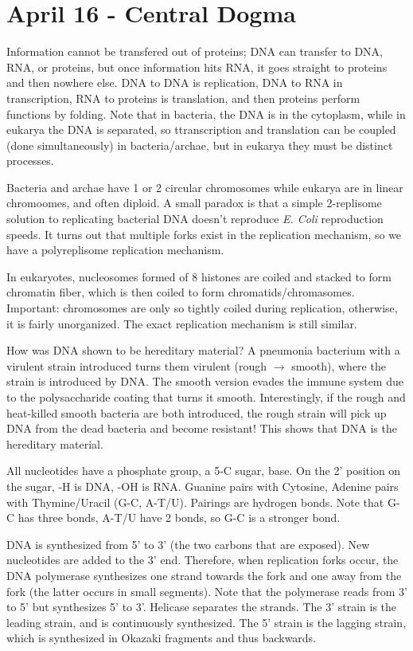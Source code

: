 \documentclass[12pt]{article}
\begin{document}
\section*{April 16 - Central Dogma}

Information cannot be transfered out of proteins; DNA can transfer to DNA, RNA, or proteins, but once information hits RNA, it goes straight to proteins and then nowhere else. DNA to DNA is replication, DNA to RNA in transcription, RNA to proteins is translation, and then proteins perform functions by folding. Note that in bacteria, the DNA is in the cytoplasm, while in eukarya the DNA is separated, so ttranscription and translation can be coupled (done simultaneously) in bacteria/archae, but in eukarya they must be distinct processes.

Bacteria and archae have 1 or 2 circular chromosomes while eukarya are in linear chromoomes, and often diploid. A small paradox is that a simple 2-replisome solution to replicating bacterial DNA doesn't reproduce \emph{E. Coli} reproduction speeds. It turns out that multiple forks exist in the replication mechanism, so we have a polyreplisome replication mechanism.

In eukaryotes, nucleosomes formed of 8 histones are coiled and stacked to form chromatin fiber, which is then coiled to form chromatids/chromasomes. Important: chromosomes are only so tightly coiled during replication, otherwise, it is fairly unorganized. The exact replication mechanism is still similar.

How was DNA shown to be hereditary material? A pneumonia bacterium with a virulent strain introduced turns them virulent (rough $\to$ smooth), where the strain is introduced by DNA. The smooth version evades the immune system due to the polysaccharide coating that turns it smooth. Interestingly, if the rough and heat-killed smooth bacteria are both introduced, the rough strain will pick up DNA from the dead bacteria and become resistant! This shows that DNA is the hereditary material. 

All nucleotides have a phosphate group, a 5-C sugar, base. On the 2' position on the sugar, -H is DNA, -OH is RNA. Guanine pairs with Cytosine, Adenine pairs with Thymine/Uracil (G-C, A-T/U). Pairings are hydrogen bonds. Note that G-C has three bonds, A-T/U have 2 bonds, so G-C is a stronger bond. 

DNA is synthesized from 5' to 3' (the two carbons that are exposed). New nucleotides are added to the 3' end. Therefore, when replication forks occur, the DNA polymerase synthesizes one strand towards the fork and one away from the fork (the latter occurs in small segments). Note that the polymerase reads from 3' to 5' but synthesizes 5' to 3'. Helicase separates the strands. The 3' strain is the leading strain, and is continuously synthesized. The 5' strain is the lagging strain, which is synthesized in Okazaki fragments and thus backwards.
\end{document}
